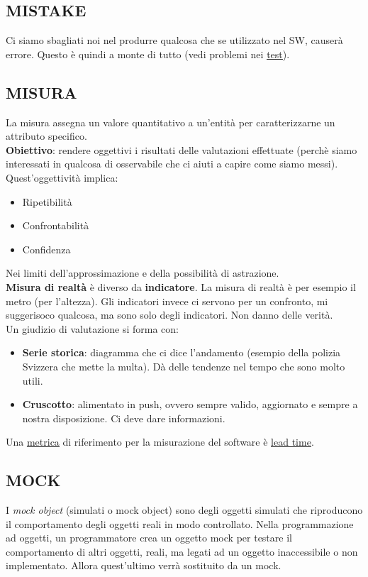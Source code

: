 		\subsection{MISTAKE}		\label{mistake}
		Ci siamo sbagliati noi nel produrre qualcosa che se utilizzato  nel SW, causerà errore. Questo è quindi a monte di tutto (vedi problemi nei \underline{\hyperref[test]{test}}).	
		
		\subsection{MISURA}	 \label{misura}
		La misura assegna un valore quantitativo a un'entità per caratterizzarne un attributo specifico. \\
		\textbf{Obiettivo}: rendere oggettivi i risultati delle valutazioni effettuate (perchè siamo interessati in qualcosa di osservabile che ci aiuti a capire come siamo messi).
		Quest'oggettività implica:
		\begin{itemize}
			\item Ripetibilità
			\item Confrontabilità
			\item Confidenza
		\end{itemize}
		Nei limiti dell'approssimazione e della possibilità di astrazione. \\
		\textbf{Misura di realtà} è diverso da \textbf{indicatore}.
		La misura di realtà è per esempio il metro (per l'altezza).
		Gli indicatori invece ci servono per un confronto, mi suggerisoco qualcosa, ma sono solo degli indicatori. Non danno delle verità. \\
		Un giudizio di valutazione si forma con: %
		\begin{itemize}
			\item \textbf{Serie storica}: diagramma che ci dice l'andamento (esempio della polizia Svizzera che mette la multa). Dà delle tendenze nel tempo che sono molto utili.
			\item \textbf{Cruscotto}: alimentato in push, ovvero sempre valido, aggiornato e sempre a nostra disposizione. Ci deve dare informazioni.
		\end{itemize}
		Una \underline{\hyperref[metrica]{metrica}} di riferimento per la misurazione del software è \underline{\hyperref[leadtime]{lead time}}. 
		
		
		

		\subsection{MOCK}		\label{mock}
		I \textit{mock object} (simulati o mock object) sono degli oggetti simulati che riproducono il comportamento degli oggetti reali in modo controllato. Nella programmazione ad oggetti, un programmatore crea un oggetto mock per testare il comportamento di altri oggetti, reali, ma legati ad un oggetto inaccessibile o non implementato. Allora quest'ultimo verrà sostituito da un mock.
		

